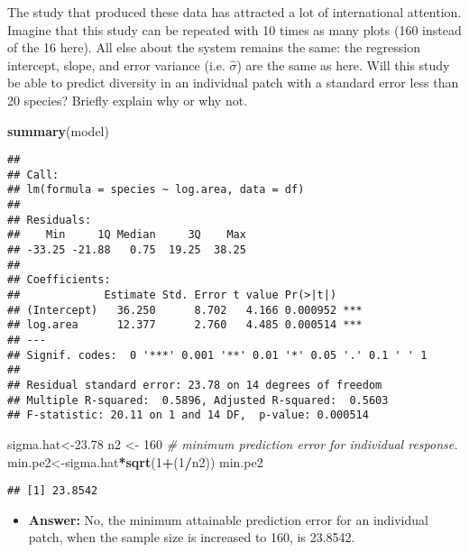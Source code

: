 \documentclass[]{article}
\newenvironment{Shaded}{\begin{snugshade}}{\end{snugshade}}
\newcommand{\KeywordTok}[1]{\textcolor[rgb]{0.13,0.29,0.53}{\textbf{#1}}}
\newcommand{\DecValTok}[1]{\textcolor[rgb]{0.00,0.00,0.81}{#1}}
\newcommand{\FloatTok}[1]{\textcolor[rgb]{0.00,0.00,0.81}{#1}}
\newcommand{\StringTok}[1]{\textcolor[rgb]{0.31,0.60,0.02}{#1}}
\newcommand{\CommentTok}[1]{\textcolor[rgb]{0.56,0.35,0.01}{\textit{#1}}}
\newcommand{\OperatorTok}[1]{\textcolor[rgb]{0.81,0.36,0.00}{\textbf{#1}}}
\newcommand{\NormalTok}[1]{#1}
\providecommand{\tightlist}{%
  \setlength{\itemsep}{0pt}\setlength{\parskip}{0pt}}
\begin{document}
The study that produced these data has attracted a lot of international
attention. Imagine that this study can be repeated with 10 times as many
plots (160 instead of the 16 here). All else about the system remains
the same: the regression intercept, slope, and error variance (i.e.
\(\hat{\sigma}\)) are the same as here. Will this study be able to
predict diversity in an individual patch with a standard error less than
20 species? Briefly explain why or why not.

\begin{Shaded}
\begin{Highlighting}[]
\KeywordTok{summary}\NormalTok{(model)}
\end{Highlighting}
\end{Shaded}

\begin{verbatim}
## 
## Call:
## lm(formula = species ~ log.area, data = df)
## 
## Residuals:
##    Min     1Q Median     3Q    Max 
## -33.25 -21.88   0.75  19.25  38.25 
## 
## Coefficients:
##             Estimate Std. Error t value Pr(>|t|)    
## (Intercept)   36.250      8.702   4.166 0.000952 ***
## log.area      12.377      2.760   4.485 0.000514 ***
## ---
## Signif. codes:  0 '***' 0.001 '**' 0.01 '*' 0.05 '.' 0.1 ' ' 1
## 
## Residual standard error: 23.78 on 14 degrees of freedom
## Multiple R-squared:  0.5896, Adjusted R-squared:  0.5603 
## F-statistic: 20.11 on 1 and 14 DF,  p-value: 0.000514
\end{verbatim}

\begin{Shaded}
\begin{Highlighting}[]
\NormalTok{sigma.hat<-}\FloatTok{23.78}
\NormalTok{n2 <-}\StringTok{ }\DecValTok{160}
\CommentTok{# minimum prediction error for individual response.}
\NormalTok{min.pe2<-sigma.hat}\OperatorTok{*}\KeywordTok{sqrt}\NormalTok{(}\DecValTok{1}\OperatorTok{+}\NormalTok{(}\DecValTok{1}\OperatorTok{/}\NormalTok{n2))}
\NormalTok{min.pe2}
\end{Highlighting}
\end{Shaded}

\begin{verbatim}
## [1] 23.8542
\end{verbatim}

\begin{itemize}
\tightlist
\item
  \textbf{Answer:} No, the minimum attainable prediction error for an
  individual patch, when the sample size is increased to 160, is
  23.8542.
\end{itemize}
\end{document}
